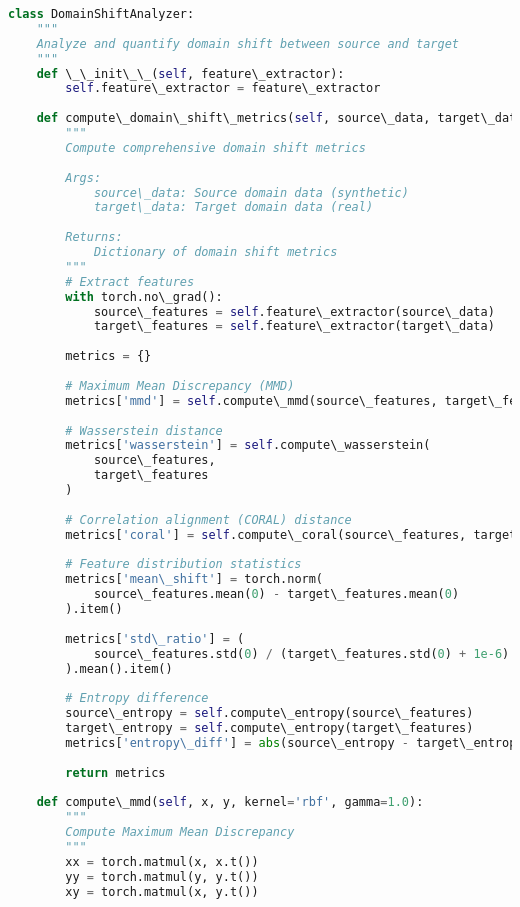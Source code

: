 \documentclass[journal]{IEEEtran}
\begin{document}
\begin{lstlisting}[language=Python, caption=Domain Shift Quantification]
class DomainShiftAnalyzer:
    """
    Analyze and quantify domain shift between source and target
    """
    def \_\_init\_\_(self, feature\_extractor):
        self.feature\_extractor = feature\_extractor
        
    def compute\_domain\_shift\_metrics(self, source\_data, target\_data):
        """
        Compute comprehensive domain shift metrics
        
        Args:
            source\_data: Source domain data (synthetic)
            target\_data: Target domain data (real)
        
        Returns:
            Dictionary of domain shift metrics
        """
        # Extract features
        with torch.no\_grad():
            source\_features = self.feature\_extractor(source\_data)
            target\_features = self.feature\_extractor(target\_data)
        
        metrics = {}
        
        # Maximum Mean Discrepancy (MMD)
        metrics['mmd'] = self.compute\_mmd(source\_features, target\_features)
        
        # Wasserstein distance
        metrics['wasserstein'] = self.compute\_wasserstein(
            source\_features, 
            target\_features
        )
        
        # Correlation alignment (CORAL) distance
        metrics['coral'] = self.compute\_coral(source\_features, target\_features)
        
        # Feature distribution statistics
        metrics['mean\_shift'] = torch.norm(
            source\_features.mean(0) - target\_features.mean(0)
        ).item()
        
        metrics['std\_ratio'] = (
            source\_features.std(0) / (target\_features.std(0) + 1e-6)
        ).mean().item()
        
        # Entropy difference
        source\_entropy = self.compute\_entropy(source\_features)
        target\_entropy = self.compute\_entropy(target\_features)
        metrics['entropy\_diff'] = abs(source\_entropy - target\_entropy)
        
        return metrics
    
    def compute\_mmd(self, x, y, kernel='rbf', gamma=1.0):
        """
        Compute Maximum Mean Discrepancy
        """
        xx = torch.matmul(x, x.t())
        yy = torch.matmul(y, y.t())
        xy = torch.matmul(x, y.t())
        

\end{lstlisting}
\end{document}
